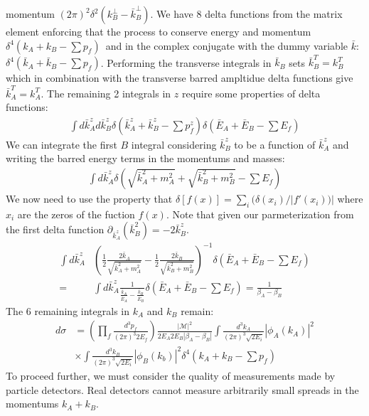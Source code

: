 momentum $(2\pi)^2 \delta^2(k_B^\perp - \bar{k}_B^\perp)$.  We have 8 delta functions from 
the matrix element enforcing that the process to conserve energy and momentum
 $\delta^4(k_A +k_B - \sum p_f)$\ and in the complex conjugate with the dummy variable
 $\bar{k}$: $\delta^4(\bar{k}_A + \bar{k}_B - \sum p_f)$. Performing the transverse 
integrals in $\bar{k}_B$ sets $\bar{k}_B^T=k_B^T$ which in combination with the transverse
 barred ampltidue delta functions give $\bar{k}_A^T = k_A^T$. The remaining 2 integrals in $z$ require some properties of delta functions:
\begin{align*}
\int d \bar{k}_A^z d \bar{k}_B^z \delta( \bar{k}^z_A + \bar{k}^z_B  - \sum p_f^z) \delta (\bar{E}_A + \bar{E}_B - \sum E_f) 
\end{align*}
We can integrate the first $B$ integral considering $\bar{k}_B^z$ to be a function of
$\bar{k}_A^z$ and writing the barred energy terms in the momentums and masses:
\begin{align*}
\int d\bar{k}_A^z  \delta \left (\sqrt{\bar{k}_A^2 +m_A^2}  + \sqrt{\bar{k}_B^2 + m_B^2} - \sum E_f \right) 
\end{align*}
We now need to use the property that $\delta[f(x)] = \sum_i (\delta(x_i) / |f'(x_i))|$ where $x_i$ are the zeros of the fuction $f(x)$. Note that given our parmeterization from the first delta function $\partial_{\bar{k}_A^z}(\bar{k}_B^2) = - 2 \bar{k}_B^z$.
\begin{align*}
\int d\bar{k}_A^z & \left (\frac{1}{2} \frac{2\bar{k}_A}{\sqrt{\bar{k}_A^2 +m_A^2}}
 - \frac{1}{2} \frac{2\bar{k}_B}{\sqrt{\bar{k}_B^2 +m_B^2}} \right )^{-1}\delta(\bar{E}_A
 + \bar{E}_B - \sum E_f) \\
=& \int d\bar{k}_A^z \frac{1}{\frac{\bar{k}_A}{\bar{E}_A}- \frac{\bar{k}_B}{\bar{E}_B}}
 \delta(\bar{E}_A + \bar{E}_B - \sum E_f) = \frac{1}{\beta_A - \beta_B}
\end{align*}
The 6 remaining integrals in $k_A$ and $k_B$ remain:
\begin{align*}
d\sigma &= \left( \prod_f \frac{d^3p_f}{(2\pi)^3 2E_f} \right ) \frac{|\mathcal{M}|^2}{2E_A2E_B|\beta_A - \beta_B|}
 \int \frac{d^3 k_A }{(2\pi)^3 \sqrt{2E_i}} |\phi_A(k_A)|^2 \\ 
&\times  \int \frac{d^3 k_B }{(2\pi)^3 \sqrt{2E_i}} |\phi_B(k_b)|^2 \delta^4( k_A + k_B - \sum p_f)
\end{align*}
To proceed further, we must consider the quality of measurements made by particle detectors. 
Real detectors cannot measure arbitrarily small spreads in the momentums $k_A+k_B$. 
